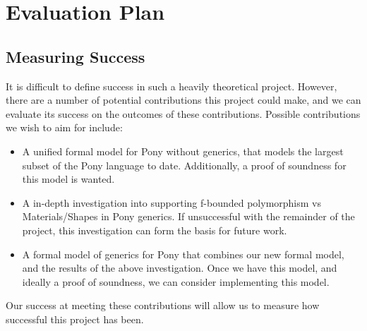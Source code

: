 \chapter{Evaluation Plan}

\section{Measuring Success}

It is difficult to define success in such a heavily theoretical project. However, there are a number of potential contributions this project could make, and we can evaluate its success on the outcomes of these contributions. Possible contributions we wish to aim for include:

\begin{itemize}
    \item A unified formal model for Pony without generics, that models the largest subset of the Pony language to date. Additionally, a proof of soundness for this model is wanted.
    \item A in-depth investigation into supporting f-bounded polymorphism vs Materials/Shapes in Pony generics. If unsuccessful with the remainder of the project, this investigation can form the basis for future work.
    \item A formal model of generics for Pony that combines our new formal model, and the results of the above investigation. Once we have this model, and ideally a proof of soundness, we can consider implementing this model.
\end{itemize}

Our success at meeting these contributions will allow us to measure how successful this project has been.